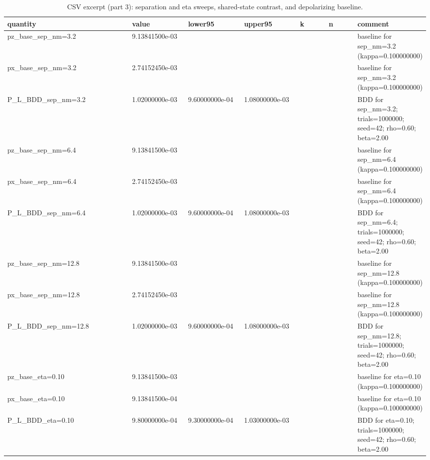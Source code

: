 \documentclass[conference]{IEEEtran}
\newcommand{\simtrials}{1000000}
\newcommand{\simseed}{42}
\newcommand{\simpz}{9.13841500e-03}
\newcommand{\simpx}{2.74152450e-03}
\newcommand{\simrhoB}{0.60}
\newcommand{\simpLB}{1.02000000e-03}
\newcommand{\simpLBlo}{9.60000000e-04}
\newcommand{\simpLBhi}{1.08000000e-03}
\newcommand{\simkB}{1020}
\newcommand{\simpzSepA}{9.13841500e-03}
\newcommand{\simpxSepA}{2.74152450e-03}
\newcommand{\simpLSepA}{1.02000000e-03}
\newcommand{\simpLSepAlo}{9.60000000e-04}
\newcommand{\simpLSepAhi}{1.08000000e-03}
\newcommand{\simkSepA}{1020}
\newcommand{\simpzSepB}{9.13841500e-03}
\newcommand{\simpxSepB}{2.74152450e-03}
\newcommand{\simpLSepB}{1.02000000e-03}
\newcommand{\simpLSepBlo}{9.60000000e-04}
\newcommand{\simpLSepBhi}{1.08000000e-03}
\newcommand{\simkSepB}{1020}
\newcommand{\simpxEtaA}{9.13841500e-04}
\newcommand{\simpLEtaA}{9.80000000e-04}
\newcommand{\simpLEtaAlo}{9.30000000e-04}
\newcommand{\simpLEtaAhi}{1.03000000e-03}
\newcommand{\simkEtaA}{980}
\begin{document}
\begin{table}[t!]
\small
\centering
\caption{CSV excerpt (part 3): separation and eta sweeps, shared-state contrast, and depolarizing baseline.}
\label{tab:csv3}
\begin{adjustbox}{width=\linewidth}
\begin{tabular}{>{\raggedright\arraybackslash}p{0.32\linewidth} >{\raggedright\arraybackslash}p{0.14\linewidth} >{\raggedright\arraybackslash}p{0.14\linewidth} >{\raggedright\arraybackslash}p{0.14\linewidth} >{\raggedright\arraybackslash}p{0.08\linewidth} >{\raggedright\arraybackslash}p{0.08\linewidth} >{\raggedright\arraybackslash}p{0.38\linewidth}}
\toprule
quantity & value & lower95 & upper95 & k & n & comment \\
\midrule
pz\_base\_sep\_nm=3.2 & \simpzSepA &  &  &  &  & baseline for sep\_nm=3.2 (kappa=0.100000000) \\
px\_base\_sep\_nm=3.2 & \simpxSepA &  &  &  &  & baseline for sep\_nm=3.2 (kappa=0.100000000) \\
P\_L\_BDD\_sep\_nm=3.2 & \simpLSepA & \simpLSepAlo & \simpLSepAhi & \simkSepA & \simtrials & BDD for sep\_nm=3.2; trials=\simtrials; seed=\simseed; rho=\simrhoB; beta=2.00 \\
pz\_base\_sep\_nm=6.4 & \simpz &  &  &  &  & baseline for sep\_nm=6.4 (kappa=0.100000000) \\
px\_base\_sep\_nm=6.4 & \simpx &  &  &  &  & baseline for sep\_nm=6.4 (kappa=0.100000000) \\
P\_L\_BDD\_sep\_nm=6.4 & \simpLB & \simpLBlo & \simpLBhi & \simkB & \simtrials & BDD for sep\_nm=6.4; trials=\simtrials; seed=\simseed; rho=\simrhoB; beta=2.00 \\
pz\_base\_sep\_nm=12.8 & \simpzSepB &  &  &  &  & baseline for sep\_nm=12.8 (kappa=0.100000000) \\
px\_base\_sep\_nm=12.8 & \simpxSepB &  &  &  &  & baseline for sep\_nm=12.8 (kappa=0.100000000) \\
P\_L\_BDD\_sep\_nm=12.8 & \simpLSepB & \simpLSepBlo & \simpLSepBhi & \simkSepB & \simtrials & BDD for sep\_nm=12.8; trials=\simtrials; seed=\simseed; rho=\simrhoB; beta=2.00 \\
pz\_base\_eta=0.10 & \simpz &  &  &  &  & baseline for eta=0.10 (kappa=0.100000000) \\
px\_base\_eta=0.10 & \simpxEtaA &  &  &  &  & baseline for eta=0.10 (kappa=0.100000000) \\
P\_L\_BDD\_eta=0.10 & \simpLEtaA & \simpLEtaAlo & \simpLEtaAhi & \simkEtaA & \simtrials & BDD for eta=0.10; trials=\simtrials; seed=\simseed; rho=\simrhoB; beta=2.00 \\

\end{tabular}
\end{adjustbox}
\end{table}
\end{document}
